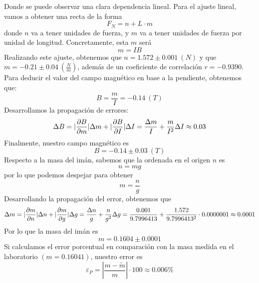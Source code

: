 \documentclass{article}
\begin{document}
Donde se puede observar una clara dependencia lineal. Para el ajuste lineal, vamos a obtener una recta de la forma
\[
    F_N = n + L\cdot m
\]
donde $n$ va a tener unidades de fuerza, y $m$ va a tener unidades de fuerza por unidad de longitud. Concretamente,
esta $m$ será
\[
    m = IB
\]
Realizando este ajuste, obtenemos que $n = 1.572\pm 0.001~(N)$ y que $m = -0.21\pm 0.04~(\frac{N}{m})$, 
además de un coeficiente de correlación $r =-0.9390$.\\
Para deducir el valor del campo magnético en base a la pendiente, obtenemos que:
\[
    B = \frac{m}{I} = -0.14~(T)
\]
Desarrollamos la propagación de errores:
\[
    \Delta B = |\pdv{B}{m}|\Delta m + |\pdv{B}{I}|\Delta I = \frac{\Delta m}{I}+ \frac{m}{I^2}\Delta I\approx 0.03
\]
Finalmente, nuestro campo magnético es
\[
    \boxed{
        B = -0.14\pm0.03~(T)
    }
\]
Respecto a la masa del imán, sabemos que la ordenada en el origen $n$ es
\[
    n = mg
\]
por lo que podemos despejar para obtener
\[
    m = \frac{n}{g}
\]
Desarrollando la propagación del error, obtenemos que
\[
    \Delta m = |\pdv{m}{n}|\Delta n +|\pdv{m}{g}|\Delta g = \frac{\Delta n}{g} + \frac{n}{g^2}\Delta g = \frac{0.001}{9.7996413} + 
    \frac{1.572}{9.7996413^2}\cdot 0.0000001 \approx 0.0001
\]
Por lo que la masa del imán es
\[
    m = 0.1604\pm0.0001
\]
Si calculamos el error porcentual en comparación con la masa medida en el laboratorio $(m = 0.16041)$, nuestro error es
\[
    \varepsilon_P = |\frac{m-\tilde{m}}{m}|\cdot 100 \approx 0.006\%
\]
\end{document}
